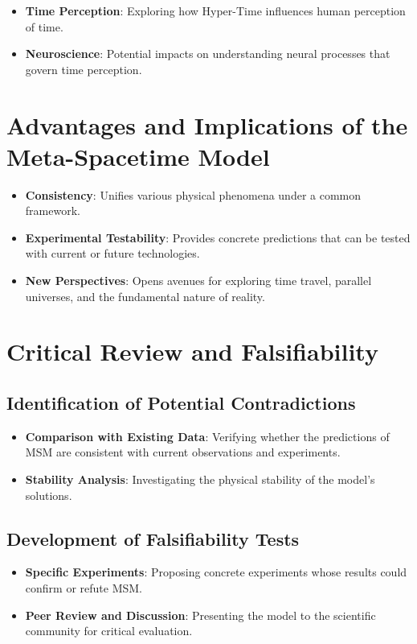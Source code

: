 \documentclass[11pt,a4paper]{article}
\begin{document}
\begin{itemize}
    \item \textbf{Time Perception}: Exploring how Hyper-Time influences human perception of time.
    \item \textbf{Neuroscience}: Potential impacts on understanding neural processes that govern time perception.
\end{itemize}

\section{Advantages and Implications of the Meta-Spacetime Model}

\begin{itemize}
    \item \textbf{Consistency}: Unifies various physical phenomena under a common framework.
    \item \textbf{Experimental Testability}: Provides concrete predictions that can be tested with current or future technologies.
    \item \textbf{New Perspectives}: Opens avenues for exploring time travel, parallel universes, and the fundamental nature of reality.
\end{itemize}

\section{Critical Review and Falsifiability}

\subsection{Identification of Potential Contradictions}

\begin{itemize}
    \item \textbf{Comparison with Existing Data}: Verifying whether the predictions of MSM are consistent with current observations and experiments.
    \item \textbf{Stability Analysis}: Investigating the physical stability of the model's solutions.
\end{itemize}

\subsection{Development of Falsifiability Tests}

\begin{itemize}
    \item \textbf{Specific Experiments}: Proposing concrete experiments whose results could confirm or refute MSM.
    \item \textbf{Peer Review and Discussion}: Presenting the model to the scientific community for critical evaluation.
\end{itemize}
\end{document}
